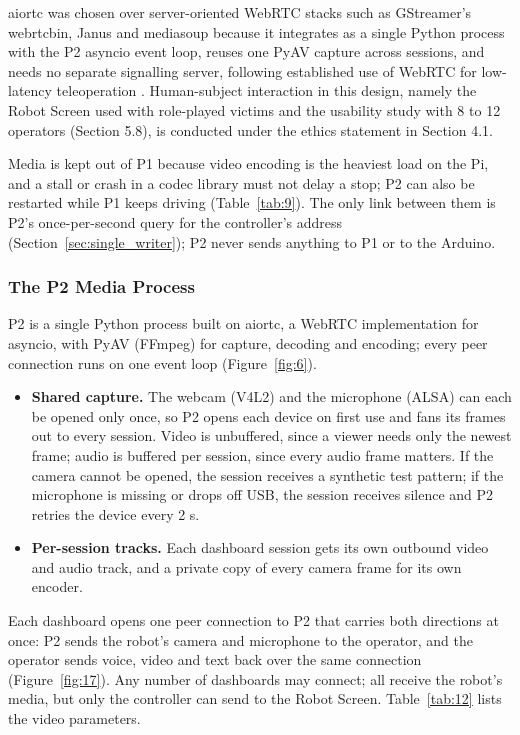 aiortc was chosen over server-oriented WebRTC stacks such as GStreamer's webrtcbin, Janus and mediasoup because it integrates as a single Python process with the P2 asyncio event loop, reuses one PyAV capture across sessions, and needs no separate signalling server, following established use of WebRTC for low-latency teleoperation \cite{shi2025webrtc}. Human-subject interaction in this design, namely the Robot Screen used with role-played victims and the usability study with 8 to 12 operators (Section 5.8), is conducted under the ethics statement in Section 4.1.

Media is kept out of P1 because video encoding is the heaviest load on the Pi, and a stall or crash in a codec library must not delay a stop; P2 can also be restarted while P1 keeps driving (Table~\ref{tab:9}). The only link between them is P2's once-per-second query for the controller's address (Section~\ref{sec:single_writer}); P2 never sends anything to P1 or to the Arduino.

\subsubsection{The P2 Media Process}
\label{sec:p2_media}

P2 is a single Python process built on aiortc, a WebRTC implementation for asyncio, with PyAV (FFmpeg) for capture, decoding and encoding; every peer connection runs on one event loop (Figure~\ref{fig:6}).

\begin{itemize}
\item \textbf{Shared capture.} The webcam (V4L2) and the microphone (ALSA) can each be opened only once, so P2 opens each device on first use and fans its frames out to every session. Video is unbuffered, since a viewer needs only the newest frame; audio is buffered per session, since every audio frame matters. If the camera cannot be opened, the session receives a synthetic test pattern; if the microphone is missing or drops off USB, the session receives silence and P2 retries the device every 2 s.
\item \textbf{Per-session tracks.} Each dashboard session gets its own outbound video and audio track, and a private copy of every camera frame for its own encoder.
\end{itemize}

Each dashboard opens one peer connection to P2 that carries both directions at once: P2 sends the robot's camera and microphone to the operator, and the operator sends voice, video and text back over the same connection (Figure~\ref{fig:17}). Any number of dashboards may connect; all receive the robot's media, but only the controller can send to the Robot Screen. Table~\ref{tab:12} lists the video parameters.


